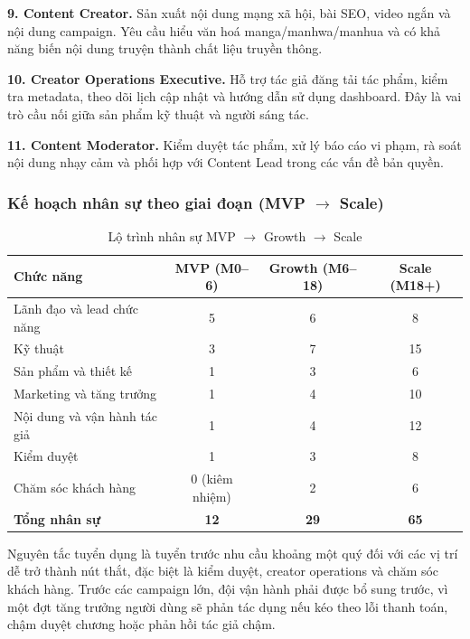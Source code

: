 \textbf{9. Content Creator.} Sản xuất nội dung mạng xã hội, bài SEO, video ngắn và nội dung campaign. Yêu cầu hiểu văn hoá manga/manhwa/manhua và có khả năng biến nội dung truyện thành chất liệu truyền thông.

\textbf{10. Creator Operations Executive.} Hỗ trợ tác giả đăng tải tác phẩm, kiểm tra metadata, theo dõi lịch cập nhật và hướng dẫn sử dụng dashboard. Đây là vai trò cầu nối giữa sản phẩm kỹ thuật và người sáng tác.

\textbf{11. Content Moderator.} Kiểm duyệt tác phẩm, xử lý báo cáo vi phạm, rà soát nội dung nhạy cảm và phối hợp với Content Lead trong các vấn đề bản quyền.

\subsubsection{\texorpdfstring{Kế hoạch nhân sự theo giai đoạn (MVP $\rightarrow$ Scale)}{Kế hoạch nhân sự theo giai đoạn (MVP -> Scale)}}

\begin{table}[htbp]
\centering
\caption{Lộ trình nhân sự MVP $\rightarrow$ Growth $\rightarrow$ Scale}
\label{tab:hr-roadmap}
\renewcommand{\arraystretch}{1.25}
\small
\begin{tabular}{|L{3.7cm}|c|c|c|}
\hline
\textbf{Chức năng} & \textbf{MVP (M0--6)} & \textbf{Growth (M6--18)} & \textbf{Scale (M18+)} \\
\hline
Lãnh đạo và lead chức năng & 5 & 6 & 8 \\
\hline
Kỹ thuật & 3 & 7 & 15 \\
\hline
Sản phẩm và thiết kế & 1 & 3 & 6 \\
\hline
Marketing và tăng trưởng & 1 & 4 & 10 \\
\hline
Nội dung và vận hành tác giả & 1 & 4 & 12 \\
\hline
Kiểm duyệt & 1 & 3 & 8 \\
\hline
Chăm sóc khách hàng & 0 (kiêm nhiệm) & 2 & 6 \\
\hline
{}\textbf{Tổng nhân sự} & \textbf{12} & \textbf{29} & \textbf{65} \\
\hline
\end{tabular}
\end{table}

Nguyên tắc tuyển dụng là tuyển trước nhu cầu khoảng một quý đối với các vị trí dễ trở thành nút thắt, đặc biệt là kiểm duyệt, creator operations và chăm sóc khách hàng. Trước các campaign lớn, đội vận hành phải được bổ sung trước, vì một đợt tăng trưởng người dùng sẽ phản tác dụng nếu kéo theo lỗi thanh toán, chậm duyệt chương hoặc phản hồi tác giả chậm.

